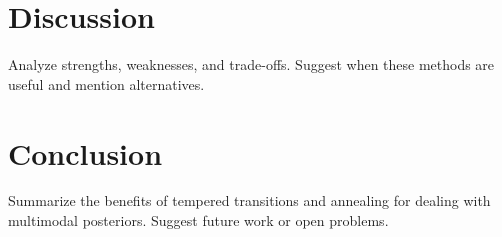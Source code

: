 \documentclass[11pt]{article}
\begin{document}
\section{Discussion}
Analyze strengths, weaknesses, and trade-offs. Suggest when these methods are useful and mention alternatives.

\section{Conclusion}
Summarize the benefits of tempered transitions and annealing for dealing with multimodal posteriors. Suggest future work or open problems.



\end{document}
